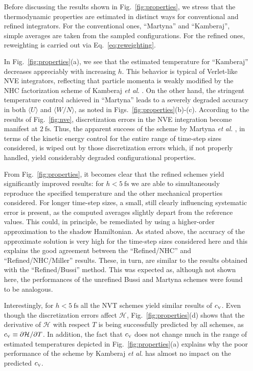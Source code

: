 \documentclass[
	aip,
	jcp,
	reprint,
]{revtex4-1}
\newcommand{\Ham}[1]{{\mathcal H}_\text{#1}}           %
\newcommand{\timestep}{h}
\newcommand{\mini}[1]{\text{\tiny{#1}}}
\begin{document}
Before discussing the results shown in Fig.~\ref{fig:properties}, we stress that the thermodynamic properties are estimated in distinct ways for conventional and refined integrators.
For the conventional ones, ``Martyna'' and ``Kamberaj'', simple averages are taken from the sampled configurations.
For the refined ones, reweighting is carried out via Eq.~\eqref{eq:reweighting}.

In Fig.~\ref{fig:properties}(a), we see that the estimated temperature for ``Kamberaj'' decreases appreciably with increasing $\timestep$.
This behavior is typical of Verlet-like NVE integrators\cite{Davidchack_2010, Silveira_2017}, reflecting that particle momenta is weakly modified by the NHC factorization scheme of Kamberaj \textit{et al}. \cite{Kamberaj_2005}.
On the other hand, the stringent temperature control achieved in ``Martyna'' leads to a severely degraded accuracy in both $\langle U \rangle$ and $\langle W/N \rangle$, as noted in Figs.~\ref{fig:properties}(b)-(c).
According to the results of Fig.~\ref{fig:nve}, discretization errors in the NVE integration become manifest at $2~\text{fs}$.
Thus, the apparent success of the scheme by Martyna \textit{et al.} \cite{Martyna_1996}, in terms of the kinetic energy control for the entire range of time-step sizes considered, is wiped out by those discretization errors which, if not properly handled, yield considerably degraded configurational properties.
 
From Fig.~\ref{fig:properties}, it becomes clear that the refined schemes yield significantly improved results: for $\timestep < 5~\text{fs}$ we are able to simultaneously reproduce the specified temperature and the other mechanical properties considered.
For longer time-step sizes, a small, still clearly influencing systematic error is present, as the computed averages slightly depart from the reference values.
This could, in principle, be remediated by using a higher-order approximation to the shadow Hamiltonian.
As stated above, the accuracy of the approximate solution is very high for the time-step sizes considered here\cite{Silveira_2017} and this explains the good agreement between the ``Refined/NHC'' and ``Refined/NHC/Miller'' results.
These, in turn, are similar to the results obtained with the ``Refined/Bussi'' method.
This was expected as, although not shown here, the performances of the unrefined Bussi\cite{Bussi_2007} and Martyna\cite{Martyna_1996} schemes were found to be analogous.

Interestingly, for $\timestep < 5~\text{fs}$ all the NVT schemes yield similar results of $c_\mini{V}$.
Even though the discretization errors affect $\Ham{}$,  Fig.~\ref{fig:properties}(d) shows that the derivative of $\Ham{}$ with respect $T$ is being successfully predicted by all schemes, as $c_\mini{V} \equiv \partial \Ham{} / \partial T$.
In addition, the fact that $c_\mini{V}$ does not change much in the range of estimated temperatures depicted in Fig.~\ref{fig:properties}(a)\cite{Yigzawe_2013} explains why the poor performance of the scheme by Kamberaj \textit{et al.} \cite{Kamberaj_2005} has almost no impact on the predicted $c_\mini{V}$. 
\end{document}
